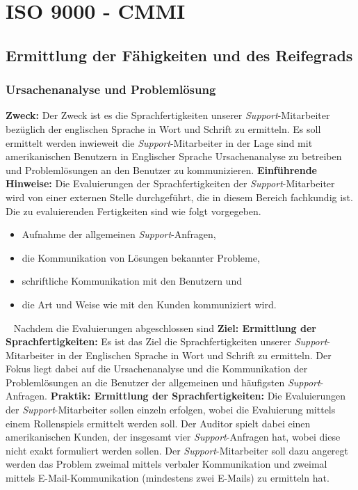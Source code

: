 \section{ISO 9000 - CMMI}
\label{sec:cmmi}
\subsection{Ermittlung der Fähigkeiten und des Reifegrads}
\subsubsection{Ursachenanalyse und Problemlösung}
\label{sec:cmmi-1}
\textbf{Zweck:}
\newline
Der Zweck ist es die Sprachfertigkeiten unserer \emph{Support}-Mitarbeiter bezüglich der englischen Sprache in Wort und Schrift zu ermitteln. Es soll ermittelt werden inwieweit die \emph{Support}-Mitarbeiter in der Lage sind mit amerikanischen Benutzern in Englischer Sprache Ursachenanalyse zu betreiben und Problemlösungen an den Benutzer zu kommunizieren.
\newline
\newline
\textbf{Einführende Hinweise:}
\newline
Die Evaluierungen der Sprachfertigkeiten der \emph{Support}-Mitarbeiter wird von einer externen Stelle durchgeführt, die in diesem Bereich fachkundig ist. Die zu evaluierenden Fertigkeiten sind wie folgt vorgegeben.
\begin{itemize}
	\item Aufnahme der allgemeinen \emph{Support}-Anfragen,
	\item die Kommunikation von Lösungen bekannter Probleme,
	\item schriftliche Kommunikation mit den Benutzern und
	\item die Art und Weise wie mit den Kunden kommuniziert wird.  
\end{itemize} 
\ \newline
Nachdem die Evaluierungen abgeschlossen sind
\newline
\newline
\textbf{Ziel: Ermittlung der Sprachfertigkeiten:}
\newline
Es ist das Ziel die Sprachfertigkeiten unserer \emph{Support}-Mitarbeiter in der Englischen Sprache in Wort und Schrift zu ermitteln. Der Fokus liegt dabei auf die Ursachenanalyse und die Kommunikation der Problemlösungen an die Benutzer der allgemeinen und häufigsten \emph{Support}-Anfragen.
\newline
\newline
\textbf{Praktik: Ermittlung der Sprachfertigkeiten:}
\newline
Die Evaluierungen der \emph{Support}-Mitarbeiter sollen einzeln erfolgen,  wobei die Evaluierung mittels einem Rollenspiels ermittelt werden soll. Der Auditor spielt dabei einen amerikanischen Kunden, der insgesamt vier \emph{Support}-Anfragen hat, wobei diese nicht exakt formuliert werden sollen. Der \emph{Support}-Mitarbeiter soll dazu angeregt werden das Problem zweimal mittels verbaler Kommunikation und zweimal mittels E-Mail-Kommunikation (mindestens zwei E-Mails) zu ermitteln hat.  

